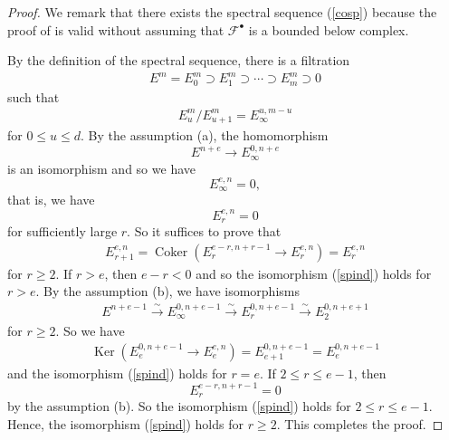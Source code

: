 \documentclass{article}
\begin{document}
%
\begin{proof}\upshape
We remark that there exists the spectral sequence (\ref{cosp})
because the proof of \cite[Theorem 2.1]{Sak5}
is valid without assuming that
$\mathcal{F}^{\bullet}$ is a bounded below complex.

By the definition of the spectral sequence, there is a filtration
%
\begin{align*}
E^{m}=E^{m}_{0}\supset 
E^{m}_{1}
\supset 
\cdots
\supset 
E^{m}_{m}
\supset 0
\end{align*}
%
such that 
%
\begin{align*}
E^{m}_{u}/E^{m}_{u+1}
=
E^{u, m-u}_{\infty}
\end{align*}
%
for $0\leq u\leq d$. By the assumption (a),
the homomorphism
%
\begin{equation*}
E^{n+e}
\to
E_{\infty}^{0, n+e}
\end{equation*}
%
is an isomorphism and so we have
%
\begin{equation*}
E_{\infty}^{e, n}
=0,
\end{equation*}
%
that is, we have 
%
\begin{equation*}
E_{r}^{e, n}
=0    
\end{equation*}
%
for sufficiently large $r$.
So it suffices to prove that
%
\begin{align}\label{spind}
E_{r+1}^{e, n}
=
\operatorname{Coker}\left(
E_{r}^{e-r, n+r-1}
\to
E_{r}^{e, n}
\right) %
=
E_{r}^{e, n}
\end{align}
%
for $r\geq 2$. If $r>e$,
then $e-r<0$ and so the isomorphism (\ref{spind})
holds for $r>e$. By the assumption (b),
we have isomorphisms
%
\begin{align*}
E^{n+e-1}
\xrightarrow{\sim}
E^{0, n+e-1}_{\infty}
\xrightarrow{\sim}
E^{0, n+e-1}_{r}
\xrightarrow{\sim}
E^{0, n+e+1}_{2}
\end{align*}
%
for $r\geq 2$. So we have
%
\begin{align*}
\operatorname{Ker}
\left(
E^{0, n+e-1}_{e}
\to 
E^{e, n}_{e}
\right)
=
E^{0, n+e-1}_{e+1}  
=
E^{0, n+e-1}_{e}
\end{align*}
%
and the isomorphism (\ref{spind}) holds for $r=e$.
%
If $2\leq r\leq e-1$, then
%
\begin{equation*}
E_{r}^{e-r, n+r-1}
=0    
\end{equation*}
%
by the assumption (b). 
So the isomorphism (\ref{spind}) holds for $2\leq r\leq e-1$.
Hence, the isomorphism (\ref{spind}) holds for $r\geq 2$. 
This completes the proof.
% 
\end{proof}
%
\end{document}
